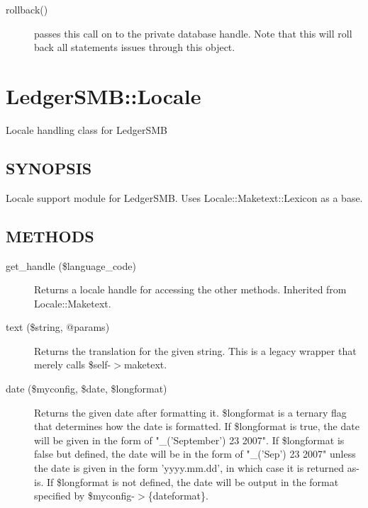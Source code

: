 \begin{description}
\begin{description}
\begin{description}
\begin{description}
\begin{description}
\begin{description}
\item[{rollback()}] \mbox{}

passes this call on to the private database handle.  Note that this will roll
back all statements issues through this object.

\end{description}
\section{LedgerSMB::Locale\label{LedgerSMB::Locale}}


Locale handling class for LedgerSMB

\subsection*{SYNOPSIS\label{LedgerSMB::Locale_SYNOPSIS}}


Locale support module for LedgerSMB.  Uses Locale::Maketext::Lexicon as a base.

\subsection*{METHODS\label{LedgerSMB::Locale_METHODS}}
\begin{description}

\item[{get\_handle (\$language\_code)}] \mbox{}

Returns a locale handle for accessing the other methods.  Inherited from 
Locale::Maketext.


\item[{text (\$string, @params)}] \mbox{}

Returns the translation for the given string.  This is a legacy wrapper that
merely calls \$self-$>$maketext.


\item[{date (\$myconfig, \$date, \$longformat)}] \mbox{}

Returns the given date after formatting it.  \$longformat is a ternary flag that
determines how the date is formatted.  If \$longformat is true, the date will be
given in the form of "\_('September') 23 2007".  If \$longformat is false but
defined, the date will be in the form of "\_('Sep') 23 2007" unless the date is
given in the form 'yyyy.mm.dd', in which case it is returned as-is.  If
\$longformat is not defined, the date will be output in the format specified by
\$myconfig-$>$\{dateformat\}.


\end{description}
\end{description}
\end{description}
\end{description}
\end{description}
\end{description}
